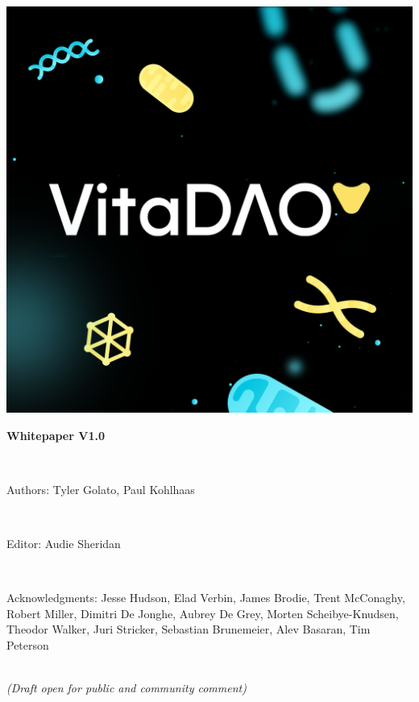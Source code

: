 \documentclass[12pt,letterpaper]{article}
\begin{document}
\begin{titlepage}
\centering
\includegraphics[width=0.8\linewidth]{images/VitaDAO Opengraph.png} 
\\
\vspace{36pt}
{\begin{Large} \textbf{Whitepaper V1.0}\end{Large}}
\\
\vspace{18pt}
{\begin{large}{Authors: Tyler Golato, Paul Kohlhaas}\end{large}}
\\
\vspace{18pt}
{\begin{small}{Editor: Audie Sheridan}\end{small}}
\\
\vspace{18pt}
{\begin{small}{Acknowledgments:  Jesse Hudson, Elad Verbin, James Brodie, Trent McConaghy, Robert Miller, Dimitri De Jonghe, Aubrey De Grey, Morten Scheibye-Knudsen, Theodor Walker, Juri Stricker, Sebastian Brunemeier, Alev Basaran, Tim Peterson}\end{small}}
\\
\vspace{18pt}
{\small\emph{(Draft open for public and community comment)}}
\end{titlepage}

\newpage

\end{document}
